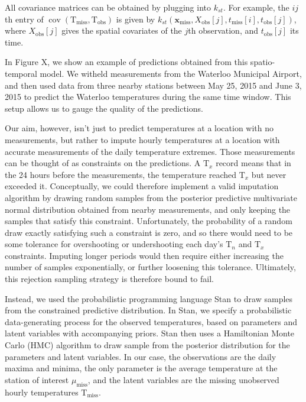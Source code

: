 \documentclass[letter]{article}
\newcommand{\genericdel}[3]{%
      \left#1#3\right#2
    }
\newcommand{\del}[1]{\genericdel(){#1}}
\newcommand{\sbr}[1]{\genericdel[]{#1}}
\DeclareMathOperator{\cov}{{cov}}
\newcommand{\T}{\mathrm{T}}
\newcommand{\Tn}{\T_{n}}
\newcommand{\Tx}{\T_{x}}
\newcommand{\xvec}{\mathbold{x}}
\newcommand{\miss}{\mathrm{miss}}
\newcommand{\obs}{\mathrm{obs}}
\begin{document}
All covariance matrices can be obtained by plugging into \(k_{st}\). For
example, the \(ij\)th entry of \(\cov\del{\T_\miss, \T_\obs}\) is given
by \(k_{st}(\xvec_\miss,X_\obs\sbr{j},t_\miss\sbr{i},t_\obs\sbr{j})\),
where \(X_\obs\sbr{j}\) gives the spatial covariates of the \(j\)th
observation, and \(t_\obs\sbr{j}\) its time.

In Figure X, we show an example of predictions obtained from this
spatio-temporal model. We witheld measurements from the Waterloo
Municipal Airport, and then used data from three nearby stations between
May 25, 2015 and June 3, 2015 to predict the Waterloo temperatures
during the same time window. This setup allows us to gauge the quality
of the predictions.
    


    	Our aim, however, isn't just to predict temperatures at a location with
no measurements, but rather to impute hourly temperatures at a location
with accurate measurements of the daily temperature extremes. Those
measurements can be thought of as constraints on the predictions. A
\(\Tx\) record means that in the 24 hours before the measurements, the
temperature reached \(\Tx\) but never exceeded it. Conceptually, we
could therefore implement a valid imputation algorithm by drawing random
samples from the posterior predictive multivariate normal distribution
obtained from nearby measurements, and only keeping the samples that
satisfy this constraint. Unfortunately, the probability of a random draw
exactly satisfying such a constraint is zero, and so there would need to
be some tolerance for overshooting or undershooting each day's \(\Tn\)
and \(\Tx\) constraints. Imputing longer periods would then require
either increasing the number of samples exponentially, or further
loosening this tolerance. Ultimately, this rejection sampling strategy
is therefore bound to fail.

Instead, we used the probabilistic programming language Stan to draw
samples from the constrained predictive distribution. In Stan, we
specify a probabilistic data-generating process for the observed
temperatures, based on parameters and latent variables with accompanying
priors. Stan then uses a Hamiltonian Monte Carlo (HMC) algorithm to draw
sample from the posterior distribution for the parameters and latent
variables. In our case, the observations are the daily maxima and
minima, the only parameter is the average temperature at the station of
interest \(\mu_\miss\), and the latent variables are the missing
unobserved hourly temperatures \(\T_\miss\).
\end{document}
